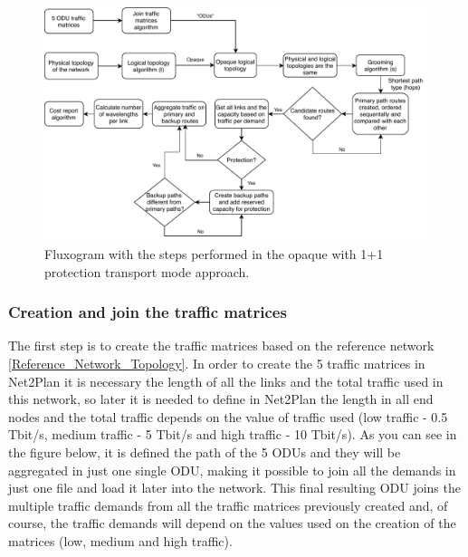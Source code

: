 \begin{figure}[H]
\centering
\includegraphics[width=16cm]{sdf/heuristic/opaque_protection/figures/fluxogram_opaque_protec}
\caption{Fluxogram with the steps performed in the opaque with 1+1 protection transport mode approach.}
\label{fluxogram_opaque_protec}
\end{figure}

\newpage
\subsubsection{Creation and join the traffic matrices}

\noindent
The first step is to create the traffic matrices based on the reference network \ref{Reference_Network_Topology}. In order to create the 5 traffic matrices in Net2Plan it is necessary the length of all the links and the total traffic used in this network, so later it is needed to define in Net2Plan the length in all end nodes and the total traffic depends on the value of traffic used (low traffic - 0.5 Tbit/s, medium traffic - 5 Tbit/s and high traffic - 10 Tbit/s). As you can see in the figure below, it is defined the path of the 5 ODUs and they will be aggregated in just one single ODU, making it possible to join all the demands in just one file and load it later into the network. This final resulting ODU joins the multiple traffic demands from all the traffic matrices previously created and, of course, the traffic demands will depend on the values used on the creation of the matrices (low, medium and high traffic).


